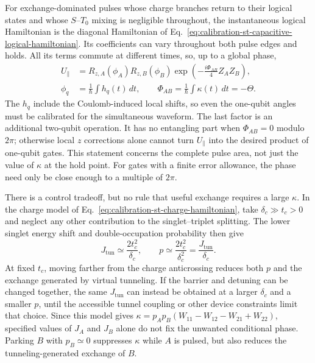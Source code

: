 For exchange-dominated pulses whose charge branches return to their
logical states and whose $S$--$T_0$ mixing is negligible throughout,
the instantaneous logical Hamiltonian is the diagonal Hamiltonian
of Eq.~\eqref{eq:calibration-st-capacitive-logical-hamiltonian}.
Its coefficients can vary throughout both pulse edges and holds.
All its terms commute at different times, so, up to a global phase,
\begin{equation}
 \begin{aligned}
 U_{\parallel}
 &=R_{z,A}(\phi_A)R_{z,B}(\phi_B)
   \exp\!\left(-\frac{i\Phi_{AB}}4 Z_AZ_B\right),\\
 \phi_q&=\frac1\hbar\int h_q(t)\,dt,\qquad
 \Phi_{AB}=\frac1\hbar\int\kappa(t)\,dt=-\Theta.
 \end{aligned}
 \label{eq:calibration-parallel-st-evolution}
\end{equation}
The $h_q$ include the Coulomb-induced local shifts, so even the
one-qubit angles must be calibrated for the simultaneous waveform.
The last factor is an additional two-qubit operation. It has no
entangling part when $\Phi_{AB}=0$ modulo $2\pi$; otherwise local
$z$ corrections alone cannot turn $U_{\parallel}$ into the desired
product of one-qubit gates. This statement concerns the complete
pulse area, not just the value of $\kappa$ at the hold point. For
gates with a finite error allowance, the phase need only be close
enough to a multiple of $2\pi$.

There is a control tradeoff, but no rule that useful exchange
requires a large $\kappa$. In the charge model of
Eq.~\eqref{eq:calibration-st-charge-hamiltonian}, take
$\delta_c\gg t_c>0$ and neglect any other contribution to the
singlet--triplet splitting. The lower singlet energy shift and
double-occupation probability then give
\begin{equation}
 J_{\mathrm{tun}}\simeq\frac{2t_c^2}{\delta_c},\qquad
 p\simeq\frac{2t_c^2}{\delta_c^2}
   =\frac{J_{\mathrm{tun}}}{\delta_c}.
 \label{eq:calibration-parallel-st-tradeoff}
\end{equation}
At fixed $t_c$, moving farther from the charge anticrossing
reduces both $p$ and the exchange generated by virtual tunneling.
If the barrier and detuning can be changed together, the same
$J_{\mathrm{tun}}$ can instead be obtained at a larger $\delta_c$
and a smaller $p$, until the accessible tunnel coupling or other
device constraints limit that choice. Since this model gives
$\kappa=p_Ap_B(W_{11}-W_{12}-W_{21}+W_{22})$, specified values of
$J_A$ and $J_B$ alone do not fix the unwanted conditional phase.
Parking $B$ with $p_B\simeq0$ suppresses $\kappa$ while $A$ is
pulsed, but also reduces the tunneling-generated exchange of $B$.

